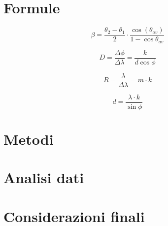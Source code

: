 \documentclass{article}
\begin{document}
    \section{Formule}

        \begin{equation}
            \label{eq:angolo di correzione}
            \beta = \frac{\theta_2 - \theta_1}{2} \cdot \frac{\cos(\theta_{av})}{1 - \cos\theta_{av}}
        \end{equation}

        \begin{equation}
            \label{eq:potere dispersivo}
            D = \frac{\Delta \phi}{\Delta \lambda} = \frac{k}{d \cos{\phi}}
        \end{equation}

        \begin{equation}
            \label{eq:potere risolutivo}
            R = \frac{\lambda}{\Delta \lambda} = m \cdot k
        \end{equation}

        \begin{equation}
            \label{eq:passo reticolo}
            d = \frac{\lambda \cdot k}{\sin{\phi}} 
        \end{equation} 


    \section{Metodi}


    \section{Analisi dati}


    \section{Considerazioni finali}
\end{document}
